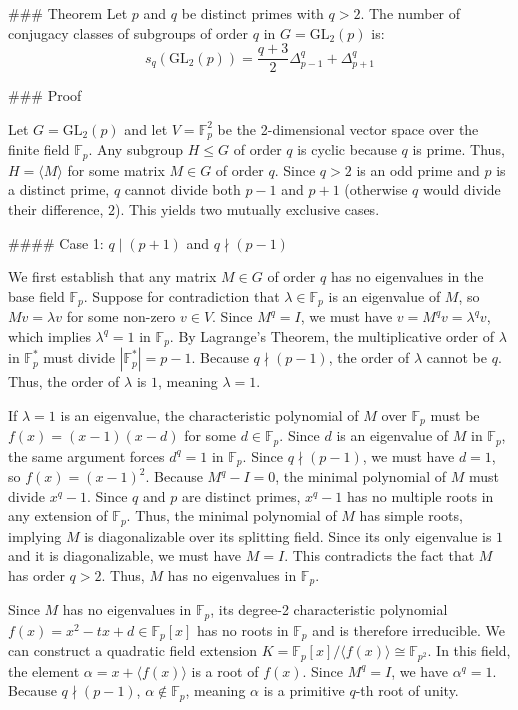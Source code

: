 ### Theorem
Let $p$ and $q$ be distinct primes with $q > 2$. The number of conjugacy classes of subgroups of order $q$ in $G = \text{GL}_2(p)$ is:
$$s_q(\text{GL}_2(p)) = \frac{q+3}{2}\Delta^q_{p-1} + \Delta^q_{p+1}$$

### Proof

Let $G = \text{GL}_2(p)$ and let $V = \mathbb{F}_p^2$ be the 2-dimensional vector space over the finite field $\mathbb{F}_p$. Any subgroup $H \leqslant G$ of order $q$ is cyclic because $q$ is prime. Thus, $H = \langle M \rangle$ for some matrix $M \in G$ of order $q$. Since $q > 2$ is an odd prime and $p$ is a distinct prime, $q$ cannot divide both $p-1$ and $p+1$ (otherwise $q$ would divide their difference, $2$). This yields two mutually exclusive cases.

#### Case 1: $q \mid (p+1)$ and $q \nmid (p-1)$

We first establish that any matrix $M \in G$ of order $q$ has no eigenvalues in the base field $\mathbb{F}_p$. Suppose for contradiction that $\lambda \in \mathbb{F}_p$ is an eigenvalue of $M$, so $Mv = \lambda v$ for some non-zero $v \in V$. Since $M^q = I$, we must have $v = M^q v = \lambda^q v$, which implies $\lambda^q = 1$ in $\mathbb{F}_p$. By Lagrange's Theorem, the multiplicative order of $\lambda$ in $\mathbb{F}_p^*$ must divide $|\mathbb{F}_p^*| = p-1$. Because $q \nmid (p-1)$, the order of $\lambda$ cannot be $q$. Thus, the order of $\lambda$ is $1$, meaning $\lambda = 1$. 

If $\lambda = 1$ is an eigenvalue, the characteristic polynomial of $M$ over $\mathbb{F}_p$ must be $f(x) = (x-1)(x-d)$ for some $d \in \mathbb{F}_p$. Since $d$ is an eigenvalue of $M$ in $\mathbb{F}_p$, the same argument forces $d^q = 1$ in $\mathbb{F}_p$. Since $q \nmid (p-1)$, we must have $d = 1$, so $f(x) = (x-1)^2$. Because $M^q - I = 0$, the minimal polynomial of $M$ must divide $x^q - 1$. Since $q$ and $p$ are distinct primes, $x^q - 1$ has no multiple roots in any extension of $\mathbb{F}_p$. Thus, the minimal polynomial of $M$ has simple roots, implying $M$ is diagonalizable over its splitting field. Since its only eigenvalue is $1$ and it is diagonalizable, we must have $M = I$. This contradicts the fact that $M$ has order $q > 2$. Thus, $M$ has no eigenvalues in $\mathbb{F}_p$.

Since $M$ has no eigenvalues in $\mathbb{F}_p$, its degree-2 characteristic polynomial $f(x) = x^2 - tx + d \in \mathbb{F}_p[x]$ has no roots in $\mathbb{F}_p$ and is therefore irreducible. We can construct a quadratic field extension $K = \mathbb{F}_p[x]/\langle f(x) \rangle \cong \mathbb{F}_{p^2}$. In this field, the element $\alpha = x + \langle f(x) \rangle$ is a root of $f(x)$. Since $M^q = I$, we have $\alpha^q = 1$. Because $q \nmid (p-1)$, $\alpha \notin \mathbb{F}_p$, meaning $\alpha$ is a primitive $q$-th root of unity. 

